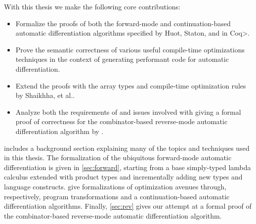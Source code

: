 With this thesis we make the following core contributions:
\begin{itemize}
  \item Formalize the proofs of both the forward-mode and continuation-based automatic differentiation algorithms specified by Huot, Staton, and \Vakar{} \cite{huot2020correctness} in \<Coq>.
  \item Prove the semantic correctness of various useful compile-time optimizations techniques in the context of generating performant code for automatic differentiation.
  \item Extend the proofs with the array types and compile-time optimization rules by Shaikhha, et al.\cite{Shaikha2019}.
  \item Analyze both the requirements of and issues involved with giving a formal proof of correctness for the combinator-based reverse-mode automatic differentiation algorithm by \Vakar{}\cite{vkr2020reverse}.
\end{itemize}

 includes a background section explaining many of the topics and techniques used in this thesis. The formalization of the ubiquitous forward-mode automatic differentiation is given in \cref{sec:forward}, starting from a base simply-typed lambda calculus extended with product types and incrementally adding new types and language constructs.  give formalizations of optimization avenues through, respectively, program transformations and a continuation-based automatic differentiation algorithms.
Finally, \cref{sec:rev} gives our attempt at a formal proof of the combinator-based reverse-mode automatic differentiation algorithm.


